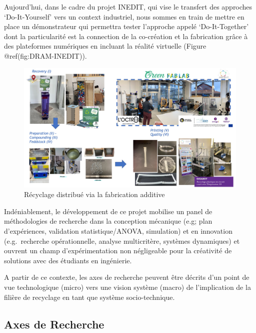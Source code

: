 \documentclass[
  11pt,
]{article}
\begin{document}
Aujourd'hui, dans le cadre du projet INEDIT, qui vise le transfert des
approches `Do-It-Yourself' vers un context industriel, nous sommes en
train de mettre en place un démonstrateur qui permettra tester
l'approche appelé `Do-It-Together' dont la particularité est la
connection de la co-création et la fabrication grâce à des plateformes
numériques en incluant la réalité virtuelle (Figure
@ref(fig:DRAM-INEDIT)).

\begin{figure}[H]

{\centering \includegraphics[width=1\textwidth,height=\textheight]{Figures/INEDIT.jpg}

}

\caption{Récyclage distribué via la fabrication additive}

\end{figure}

Indéniablement, le développement de ce projet mobilise un panel de
méthodologies de recherche dans la conception mécanique (e.g; plan
d'expériences, validation statistique/ANOVA, simulation) et en
innovation (e.g.~recherche opérationnelle, analyse multicritère,
systèmes dynamiques) et ouvrent un champ d'expérimentation non
négligeable pour la créativité de solutions avec des étudiants en
ingénierie.

A partir de ce contexte, les axes de recherche peuvent être décrits d'un
point de vue technologique (micro) vers une vision système (macro) de
l'implication de la filière de recyclage en tant que système
socio-technique.

\hypertarget{axes-de-recherche}{%
\subsection{Axes de Recherche}\label{axes-de-recherche}}
\end{document}
